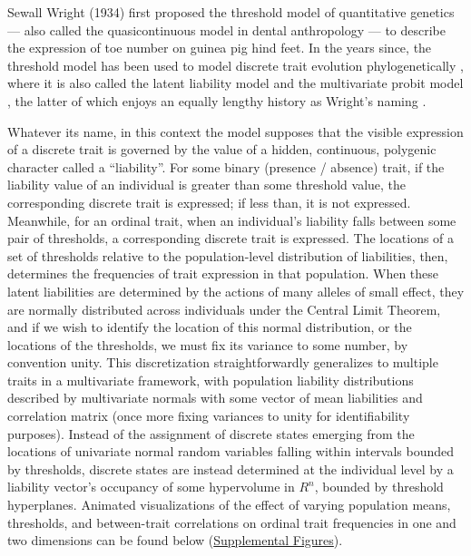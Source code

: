 Sewall Wright (1934) first proposed the threshold model of quantitative genetics --- also called the quasicontinuous model \citep{grunebergGeneticalStudiesSkeleton1955} in dental anthropology --- to describe the expression of toe number on guinea pig hind feet. In the years since, the threshold model has been used to model discrete trait evolution phylogenetically \citep{felsensteinUsingQuantitativeGenetic2005, felsensteinComparativeMethodBoth2012, revellAncestralCharacterEstimation2014a}, where it is also called the latent liability model \citep{cybisAssessingPhenotypicCorrelation2015} and the multivariate probit model \citep{zhangLargescaleInferenceCorrelation2019}, the latter of which enjoys an equally lengthy history as Wright's naming \citep{blissMethodProbits1934, chibAnalysisMultivariateProbit1998}. 

Whatever its name, in this context the model supposes that the visible expression of a discrete trait is governed by the value of a hidden, continuous, polygenic character called a “liability”. For some binary (presence / absence) trait, if the liability value of an individual is greater than some threshold value, the corresponding discrete trait is expressed; if less than, it is not expressed. Meanwhile, for an ordinal trait, when an individual's liability falls between some pair of thresholds, a corresponding discrete trait is expressed. The locations of a set of thresholds relative to the population-level distribution of liabilities, then, determines the frequencies of trait expression in that population. When these latent liabilities are determined by the actions of many alleles of small effect, they are normally distributed across individuals under the Central Limit Theorem, and if we wish to identify the location of this normal distribution, or the locations of the thresholds, we must fix its variance to some number, by convention unity. This discretization straightforwardly generalizes to multiple traits in a multivariate framework, with population liability distributions described by multivariate normals with some vector of mean liabilities and correlation matrix (once more fixing variances to unity for identifiability purposes). Instead of the assignment of discrete states emerging from the locations of univariate normal random variables falling within intervals bounded by thresholds, discrete states are instead determined at the individual level by a liability vector's occupancy of some hypervolume in $R^n$, bounded by threshold hyperplanes. Animated visualizations of the effect of varying population means, thresholds, and between-trait correlations on ordinal trait frequencies in one and two dimensions can be found below (\hyperref[supp:SupplementalFiguresThresholdModel]{Supplemental Figures}).

